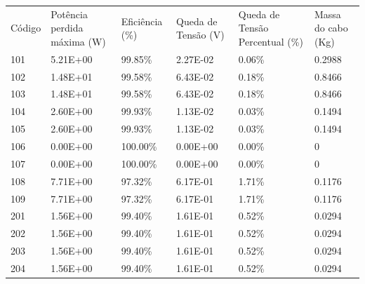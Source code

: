 \documentclass{article}
\begin{document}
\begin{landscape}
\begin{table}[]
\begin{tabular}{llllll}
Código & Potência perdida máxima (W) & Eficiência (\%) & Queda de Tensão (V) & Queda de Tensão Percentual (\%) & Massa do cabo (Kg) \\
101    & 5.21E+00                    & 99.85\%         & 2.27E-02            & 0.06\%                          & 0.2988             \\
102    & 1.48E+01                    & 99.58\%         & 6.43E-02            & 0.18\%                          & 0.8466             \\
103    & 1.48E+01                    & 99.58\%         & 6.43E-02            & 0.18\%                          & 0.8466             \\
104    & 2.60E+00                    & 99.93\%         & 1.13E-02            & 0.03\%                          & 0.1494             \\
105    & 2.60E+00                    & 99.93\%         & 1.13E-02            & 0.03\%                          & 0.1494             \\
106    & 0.00E+00                    & 100.00\%        & 0.00E+00            & 0.00\%                          & 0                  \\
107    & 0.00E+00                    & 100.00\%        & 0.00E+00            & 0.00\%                          & 0                  \\
108    & 7.71E+00                    & 97.32\%         & 6.17E-01            & 1.71\%                          & 0.1176             \\
109    & 7.71E+00                    & 97.32\%         & 6.17E-01            & 1.71\%                          & 0.1176             \\
201    & 1.56E+00                    & 99.40\%         & 1.61E-01            & 0.52\%                          & 0.0294             \\
202    & 1.56E+00                    & 99.40\%         & 1.61E-01            & 0.52\%                          & 0.0294             \\
203    & 1.56E+00                    & 99.40\%         & 1.61E-01            & 0.52\%                          & 0.0294             \\
204    & 1.56E+00                    & 99.40\%         & 1.61E-01            & 0.52\%                          & 0.0294             \\

\end{tabular}
\end{table}
\end{landscape}
\end{document}
